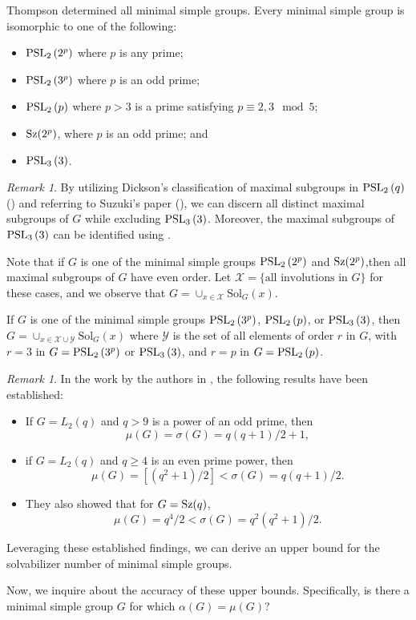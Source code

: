 \documentclass{amsart}
\newcommand{\Solv}{\text{Sol}}
\theoremstyle{definition}
\theoremstyle{remark}
\newtheorem{remark}[theorem]{Remark}
\begin{document}
Thompson \cite[Corollary 1]{Thompson} determined all minimal simple groups. Every minimal simple group is isomorphic to one of the following: 
\begin{itemize} 
\item[{\rm (a)}]  $\operatorname{PSL}_{2}\left(2^p\right)$ where $p$ is any prime; 
\item[{\rm (b)}]  $\operatorname{PSL}_{2}\left(3^p\right)$ where $p$ is an odd prime; 
\item[{\rm (c)}]  $\operatorname{PSL}_{2}\left(p\right)$ where $p > 3$ is a prime satisfying $p \equiv 2,3 \mod 5$; 
\item[{\rm (d)}]  ${\rm Sz}(2^p)$, where $p$ is an odd prime; and \item[{\rm (e)}] $\operatorname{PSL}_{3}\left(3\right)$.
\end{itemize}
\begin{remark}
By utilizing Dickson's classification of maximal subgroups in $\operatorname{PSL}_{2}\left(q\right)$ (\cite{Dickson}) and referring to Suzuki's paper (\cite{Suzuki}), we can discern all distinct maximal subgroups of $G$ while excluding $\operatorname{PSL}_{3}\left(3\right)$. Moreover, the maximal subgroups of $\operatorname{PSL}_{3}\left(3\right)$ can be identified using \cite{GAP4}.

Note that if  $G$ is one of the minimal simple groups $\operatorname{PSL}_{2}\left(2^p\right)$ and ${\rm Sz}(2^p)$,then all maximal subgroups of $G$ have even order. Let $\mathscr{X}=\{\text{all involutions in } G\}$  for these cases, and we observe that $G=\cup_{x\in\mathscr{X}}\Solv_G(x)$.


If $G$ is one of the minimal simple groups $\operatorname{PSL}_{2}\left(3^p\right)$, $\operatorname{PSL}_{2}\left(p\right)$, or $\operatorname{PSL}_{3}\left(3\right)$, then $G=\cup_{x\in\mathscr{X}\cup \mathscr{Y}}\Solv_G(x)$ where $\mathscr{Y}$ is the set of all elements of order $r$ in $G$, with $r=3$ in $G=\operatorname{PSL}_{2}\left(3^p\right)$ or $\operatorname{PSL}_{3}\left(3\right)$, and $r=p$ in $G=\operatorname{PSL}_{2}\left(p\right)$.
\end{remark}
\begin{remark}
In the work by the authors in \cite{LM}, the following results have been established:
\begin{itemize}
    \item  If $G=L_2(q)$ and $q>9$ is a power of an odd prime, then $$\mu(G)=\sigma(G)=q(q+1)/2+1,$$ 
    \item if  $G=L_2(q)$ and $q\geq 4$ is an even prime power, then $$\mu(G)=[(q^2+1)/2]<\sigma(G)=q(q+1)/2.$$
    
    \item They also showed that for $G={\rm Sz}(q)$, $$\mu(G)=q^4/2<\sigma(G)=q^2(q^2+1)/2.$$ 
    \end{itemize}
    Leveraging these established findings, we can derive an upper bound for the solvabilizer number of minimal simple groups.
\end{remark}
Now, we inquire about the accuracy of these upper bounds. Specifically, is there a minimal simple group $G$ for which $\alpha(G)=\mu(G)$?
\end{document}
